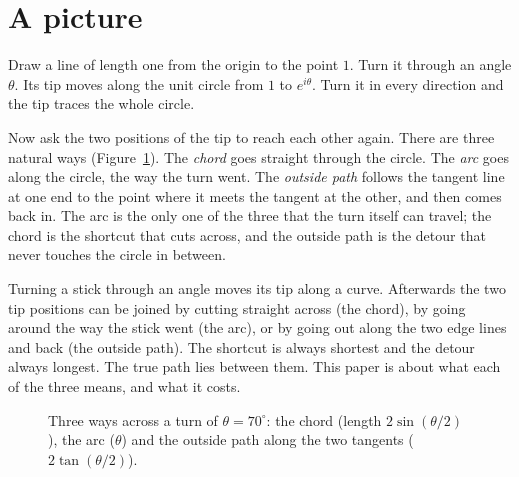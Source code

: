 \documentclass[11pt]{article}
\begin{document}
\section{A picture}\label{sec:picture}

Draw a line of length one from the origin to the point $1$. Turn it through an angle
$\theta$. Its tip moves along the unit circle from $1$ to $e^{i\theta}$. Turn it in every
direction and the tip traces the whole circle.

Now ask the two positions of the tip to reach each other again. There are three natural
ways (Figure~\ref{fig:three}). The \emph{chord} goes straight through the circle. The
\emph{arc} goes along the circle, the way the turn went. The \emph{outside path} follows the
tangent line at one end to the point where it meets the tangent at the other, and then
comes back in. The arc is the only one of the three that the turn itself can travel; the
chord is the shortcut that cuts across, and the outside path is the detour that never
touches the circle in between.

\begin{plain}
Turning a stick through an angle moves its tip along a curve. Afterwards the two tip
positions can be joined by cutting straight across (the chord), by going around the way
the stick went (the arc), or by going out along the two edge lines and back (the outside
path). The shortcut is always shortest and the detour always longest. The true path lies
between them. This paper is about what each of the three means, and what it costs.
\end{plain}

\begin{figure}[t]\centering
{}
\caption{Three ways across a turn of $\theta=70^\circ$: the chord (length $2\sin(\theta/2)$),
the arc ($\theta$) and the outside path along the two tangents ($2\tan(\theta/2)$).}
\label{fig:three}
\end{figure}
\end{document}

